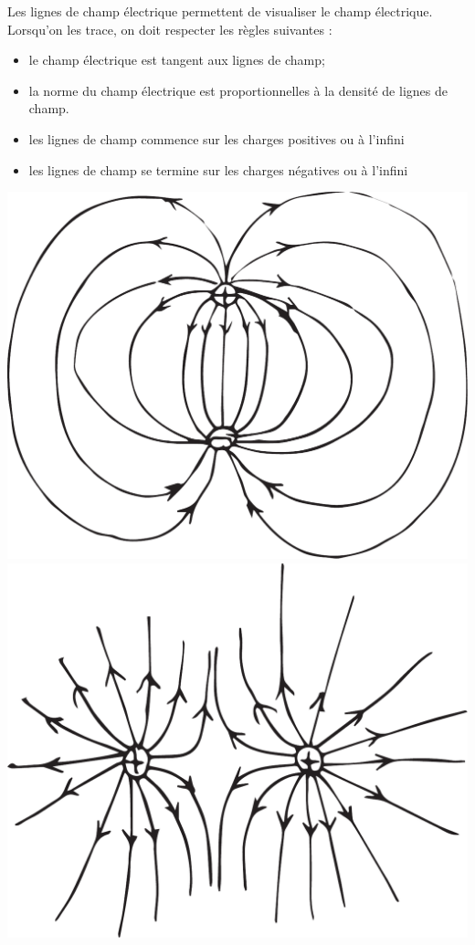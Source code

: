   Les lignes de champ électrique permettent de visualiser le champ électrique.
  Lorsqu'on les trace, on doit respecter les règles suivantes :

  \begin{itemize}
    \item le champ électrique est tangent aux lignes de champ;
    \item la norme du champ électrique est proportionnelles à la densité de
      lignes de champ.
    \item les lignes de champ commence sur les charges positives ou à l'infini
    \item les lignes de champ se termine sur les charges négatives ou à
      l'infini
  \end{itemize}

  \begin{center}
      \includegraphics[scale=0.3]{02-champ-electrique/figures/lignes-champ-dipole.pdf}
      \includegraphics[scale=0.3]{02-champ-electrique/figures/lignes-champ-deux-plus.pdf}
  \end{center}

